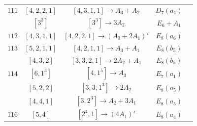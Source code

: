 \documentclass[reqno,12pt]{amsart}
\numberwithin{equation}{section}
\theoremstyle{plain}
\theoremstyle{definition}
\begin{document}
\begin{table}[htbp]
\begin{tabular}{|c|c|c|c|c|}
$ 111$    &  $ [4,2,2,1]$  &$[4,3,1,1]\rightarrow      A_3+A_2 $  &   $D_7(a_1) $        \\ 
   &  $ [3^3]$  &$[3^3]\rightarrow      3A_2 $  &   $E_6+A_1 $        \\ \hline

$ 112$    &  $ [4,3,1,1]$  &$[4,2,2,1]\rightarrow      (A_3+2A_1)' $  &   $E_8(a_6) $        \\ 
\hline
$ 113$    &  $ [5,2,1,1]$  &$[4,2,1,1]\rightarrow      A_3+A_1 $  &   $E_8(b_5) $        \\ 
   &  $ [4,3,2]$  &$[3,3,2,1]\rightarrow      2A_2+A_1 $  &   $E_8(b_5) $        \\ \hline

$ 114$    &  $ [6,1^3]$  &$[4,1^5]\rightarrow      A_3 $  &   $E_7(a_1) $        \\ 
   &  $ [5,2,2]$  &$[3,3,1^3]\rightarrow      2A_2 $  &   $E_8(a_5) $        \\ 
   &  $ [4,4,1]$  &$[3,2^3]\rightarrow      A_2+3A_1 $  &   $E_8(a_5) $        \\ \hline
$ 116$    &  $ [5,4]$  &$[2^4,1]\rightarrow      (4A_1)' $  &   $E_8(a_4) $        \\
\hline
  
	\end{tabular}
	\bigskip
	
\end{table}
\end{document}
